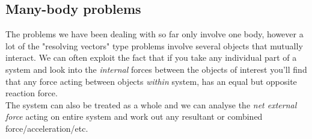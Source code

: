 \subsection{Many-body problems}

The problems we have been dealing with so far only involve one body, however a lot of the "resolving vectors" type problems involve several objects that mutually interact. We can often exploit the fact that if you take any individual part of a system and look into the \textit{internal} forces between the objects of interest you'll find that any force acting between objects \emph{within} system, has an equal but opposite reaction force.\\
The system can also be treated as a whole and we can analyse the \textit{net external force} acting on entire system and work out any resultant or combined force/acceleration/etc.



